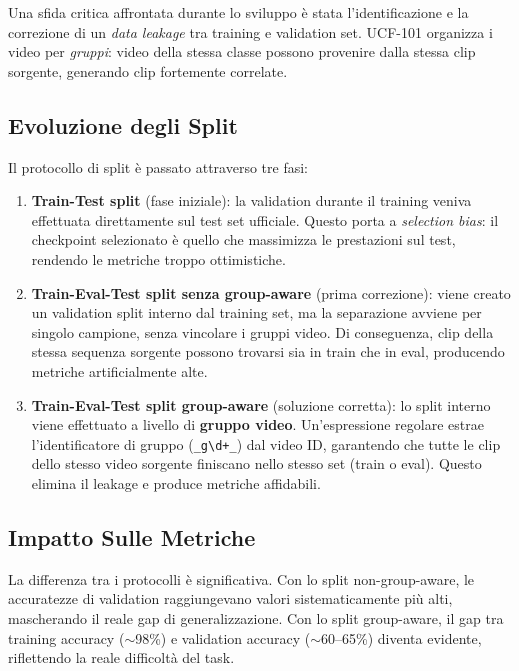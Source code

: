Una sfida critica affrontata durante lo sviluppo è stata l'identificazione e la correzione di un \textit{data leakage} tra training e validation set. UCF-101 organizza i video per \textit{gruppi}: video della stessa classe possono provenire dalla stessa clip sorgente, generando clip fortemente correlate.

\subsection{Evoluzione degli Split}

Il protocollo di split è passato attraverso tre fasi:

\begin{enumerate}
    \item \textbf{Train-Test split} (fase iniziale): la validation durante il training veniva effettuata direttamente sul test set ufficiale. Questo porta a \textit{selection bias}: il checkpoint selezionato è quello che massimizza le prestazioni sul test, rendendo le metriche troppo ottimistiche.
    
    \item \textbf{Train-Eval-Test split senza group-aware} (prima correzione): viene creato un validation split interno dal training set, ma la separazione avviene per singolo campione, senza vincolare i gruppi video. Di conseguenza, clip della stessa sequenza sorgente possono trovarsi sia in train che in eval, producendo metriche artificialmente alte.
    
    \item \textbf{Train-Eval-Test split group-aware} (soluzione corretta): lo split interno viene effettuato a livello di \textbf{gruppo video}. Un'espressione regolare estrae l'identificatore di gruppo (\texttt{\_g\textbackslash d+\_}) dal video ID, garantendo che tutte le clip dello stesso video sorgente finiscano nello stesso set (train o eval). Questo elimina il leakage e produce metriche affidabili.
\end{enumerate}

\subsection{Impatto Sulle Metriche}

La differenza tra i protocolli è significativa. Con lo split non-group-aware, le accuratezze di validation raggiungevano valori sistematicamente più alti, mascherando il reale gap di generalizzazione. Con lo split group-aware, il gap tra training accuracy ($\sim$98\%) e validation accuracy ($\sim$60--65\%) diventa evidente, riflettendo la reale difficoltà del task.

